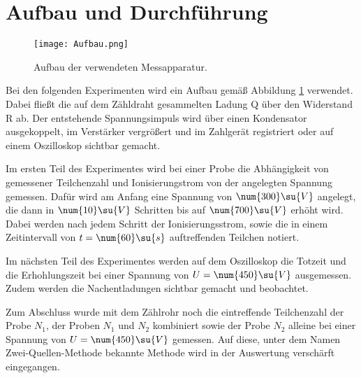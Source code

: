 \newpage

\section{Aufbau und Durchführung}

\begin{figure}
  \centering
  \texttt{[image: Aufbau.png]}
  \caption{Aufbau der verwendeten Messapparatur.}
  \label{fig:Aufbau}
\end{figure}

Bei den folgenden Experimenten wird ein Aufbau gemäß Abbildung \ref{fig:Aufbau}
verwendet. Dabei fließt die auf dem Zähldraht gesammelten Ladung Q über
den Widerstand R ab. Der entstehende Spannungsimpuls wird über einen Kondensator
ausgekoppelt, im Verstärker vergrößert und im Zahlgerät registriert oder auf einem
Oszilloskop sichtbar gemacht.

Im ersten Teil des Experimentes wird bei einer Probe die Abhängigkeit von gemessener
Teilchenzahl und Ionisierungstrom von der angelegten Spannung gemessen. Dafür wird
am Anfang eine Spannung von $\num{300}\su{V}$ angelegt, die dann in $\num{10}\su{V}$ Schritten
bis auf $\num{700}\su{V}$ erhöht wird.
Dabei werden nach jedem Schritt der Ionisierungsstrom, sowie die in einem
Zeitintervall von $t = \num{60}\su{s}$ auftreffenden Teilchen notiert.

Im nächsten Teil des Experimentes werden auf dem Oszilloskop die Totzeit und die
Erhohlungszeit bei einer Spannung von $U = \num{450}\su{V}$ ausgemessen. Zudem werden
die Nachentladungen sichtbar gemacht und beobachtet.

Zum Abschluss wurde mit dem Zählrohr noch die eintreffende Teilchenzahl der
Probe $N_1$, der Proben $N_1$ und $N_2$ kombiniert sowie der Probe $N_2$ alleine
bei einer Spannung von $U = \num{450}\su{V}$ gemessen. Auf diese, unter dem Namen
Zwei-Quellen-Methode bekannte Methode wird in der Auswertung verschärft eingegangen.
